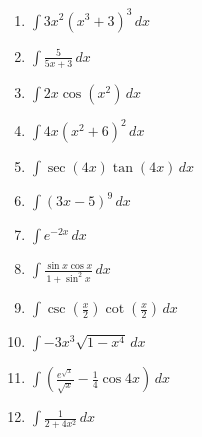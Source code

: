 \documentclass[12pt]{article}
\newif\ifans
\begin{document}
\begin{enumerate}

\item $\int 3x^2(x^3+3)^3 \,dx$ 

\ifans{\fbox{$\frac{1}{4}(x^3+3)^4+C$}} \fi

\item $\int \frac{5}{5x+3} \,dx$ 

\ifans{\fbox{$\ln{|5x+3|}+C$}} \fi

\item $\int 2x\cos{(x^2)} \,dx$ 

\ifans{\fbox{$\sin{(x^2)}+C$}} \fi

\item $\int 4x(x^2+6)^2 \,dx$ 

\ifans{\fbox{$\frac{2}{3}(x^2+6)^3+C$}} \fi

\item $\int \sec{(4x)}\tan{(4x)} \,dx$ 

\ifans{\fbox{$\frac{1}{4}\sec{(4x)}+C$}} \fi

\item $\int (3x-5)^{9} \,dx$ 

\ifans{\fbox{$\frac{1}{30}(3x-5)^{10}+C$}} \fi

\item $\int e^{-2x} \,dx$ 

\ifans{\fbox{$-\frac{1}{2}e^{-2x}+C$}} \fi

\item $\int \frac{\sin{x}\cos{x}}{1+\sin^{2}{x}} \,dx$ 

\ifans{\fbox{$\frac{1}{2}\ln{(1+\sin^2{x}})+C$}} \fi

\item $\int \csc{\left(\frac{x}{2}\right)}\cot{\left(\frac{x}{2}\right)} \,dx$ 

\ifans{\fbox{$-2\csc{\left(\frac{x}{2}\right)}+C$}} \fi

\item $\int -3x^3\sqrt{1-x^4} \,dx$ 

\ifans{\fbox{$\frac{1}{2}(1-x^{4})^{\frac{3}{2}}+C$}} \fi

\item $\int \left(\frac{e^{\sqrt{x}}}{\sqrt{x}}-\frac{1}{4}\cos{4x}\right) \,dx$ 

\ifans{\fbox{$2e^{\sqrt{x}}-\frac{1}{16}\sin{(4x)}+C$}} \fi

\item $\int \frac{1}{2+4x^2} \,dx$ 

\ifans{\fbox{$\frac{1}{2\sqrt{2}}\arctan{(\sqrt{2}x)}+C$}} \fi


\end{enumerate}
\end{document}

